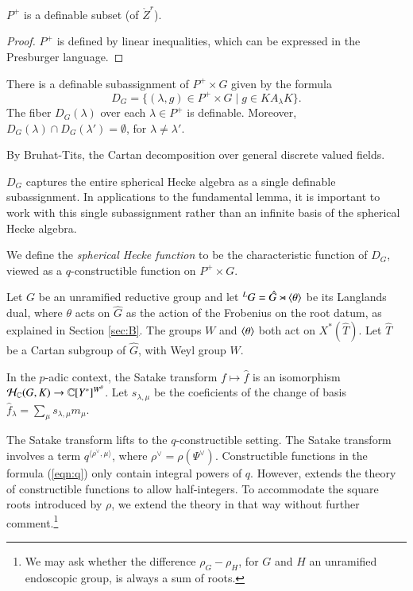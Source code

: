 \begin{lemma} $P^+$ is a definable subset (of $\ring{Z}^r$).
\end{lemma}

\begin{proof} $P^+$ is defined by linear inequalities, which can be expressed in the Presburger language.
\end{proof}


\begin{lemma} There is a definable subassignment of $P^+\times G$ given by the formula
\[
D_G = \{(\lambda,g)\in P^+\times G \mid g \in K A_\lambda K \}.
\]
The fiber $D_G(\lambda)$ over each $\lambda\in P^+$ is definable.  Moreover,
$D_G(\lambda)\cap D_G(\lambda') = \emptyset$, for $\lambda\ne \lambda'$.
\end{lemma}

By Bruhat-Tits,  the Cartan decomposition over general discrete valued fields.

\begin{remark}   $D_G$ captures the entire spherical Hecke algebra as a single
definable subassignment.  In applications to the fundamental lemma, 
it is important to work with this single subassignment
rather than an infinite basis of the spherical Hecke algebra.
\end{remark}

We define the {\it spherical Hecke function} to be the characteristic function of $D_G$, viewed as a $q$-constructible function
on $P^+\times G$.

Let $G$ be an unramified reductive group and let ${}^LG = \hat G\rtimes \langle{\theta}\rangle$ be its Langlands dual, where
$\theta$ acts on $\hat G$ as the action of the Frobenius on the root datum, as explained in Section \ref{sec:B}.
The groups $W$ and $\langle{\theta}\rangle$ both act on $X^*(\hat T)$.  
Let $\hat T$ be a Cartan subgroup of $\hat G$, with Weyl group $W$.




In the $p$-adic context, the Satake transform $f\mapsto \hat f$
is an isomorphism  $\mathcal H_{\mathbb{C}}(G,K)\to\mathbb{C}[Y^*]^{W^\theta}$.
Let $s_{\lambda,\mu}$ be the coeficients of the change of basis $\hat f_\lambda = \sum_\mu s_{\lambda,\mu} m_\mu$.

The Satake transform lifts to the $q$-constructible setting.  The Satake transform involves
a term $q^{\langle\rho^\vee,\mu\rangle}$, where $\rho^\vee = \rho(\Psi^\vee)$.   Constructible functions
in the formula (\ref{eqn:q})  only contain integral powers of $q$.  However, \cite[\S B.3.1]{cluckers2011local} 
extends the theory of constructible functions to allow half-integers.  To accommodate the square roots introduced by $\rho$,
we extend
the theory in that way without further comment.\footnote{We may ask whether the difference $\rho_G - \rho_H$,
for $G$ and $H$ an unramified endoscopic group, is always a sum of roots.}

